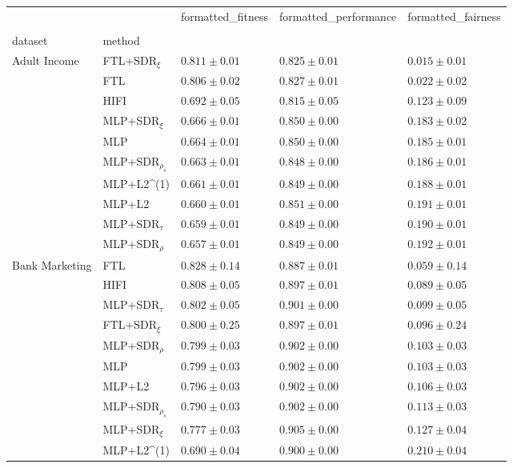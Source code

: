 \begin{tabular}{lllll}
\toprule
 &  & formatted_fitness & formatted_performance & formatted_fairness \\
 &  &  &  &  \\
dataset & method &  &  &  \\
\midrule
\multirow[t]{10}{*}{Adult Income} & FTL+SDR$_{\xi}$ & $0.811 \pm0.01$ & $0.825 \pm0.01$ & $0.015 \pm0.01$ \\
 & FTL & $0.806 \pm0.02$ & $0.827 \pm0.01$ & $0.022 \pm0.02$ \\
 & HIFI & $0.692 \pm0.05$ & $0.815 \pm0.05$ & $0.123 \pm0.09$ \\
 & MLP+SDR$_{\xi}$ & $0.666 \pm0.01$ & $0.850 \pm0.00$ & $0.183 \pm0.02$ \\
 & MLP & $0.664 \pm0.01$ & $0.850 \pm0.00$ & $0.185 \pm0.01$ \\
 & MLP+SDR$_{\rho_s}$ & $0.663 \pm0.01$ & $0.848 \pm0.00$ & $0.186 \pm0.01$ \\
 & MLP+L2^{(1)} & $0.661 \pm0.01$ & $0.849 \pm0.00$ & $0.188 \pm0.01$ \\
 & MLP+L2 & $0.660 \pm0.01$ & $0.851 \pm0.00$ & $0.191 \pm0.01$ \\
 & MLP+SDR$_{\tau}$ & $0.659 \pm0.01$ & $0.849 \pm0.00$ & $0.190 \pm0.01$ \\
 & MLP+SDR$_{\rho}$ & $0.657 \pm0.01$ & $0.849 \pm0.00$ & $0.192 \pm0.01$ \\
\cline{1-5}
\multirow[t]{10}{*}{Bank Marketing} & FTL & $0.828 \pm0.14$ & $0.887 \pm0.01$ & $0.059 \pm0.14$ \\
 & HIFI & $0.808 \pm0.05$ & $0.897 \pm0.01$ & $0.089 \pm0.05$ \\
 & MLP+SDR$_{\tau}$ & $0.802 \pm0.05$ & $0.901 \pm0.00$ & $0.099 \pm0.05$ \\
 & FTL+SDR$_{\xi}$ & $0.800 \pm0.25$ & $0.897 \pm0.01$ & $0.096 \pm0.24$ \\
 & MLP+SDR$_{\rho}$ & $0.799 \pm0.03$ & $0.902 \pm0.00$ & $0.103 \pm0.03$ \\
 & MLP & $0.799 \pm0.03$ & $0.902 \pm0.00$ & $0.103 \pm0.03$ \\
 & MLP+L2 & $0.796 \pm0.03$ & $0.902 \pm0.00$ & $0.106 \pm0.03$ \\
 & MLP+SDR$_{\rho_s}$ & $0.790 \pm0.03$ & $0.902 \pm0.00$ & $0.113 \pm0.03$ \\
 & MLP+SDR$_{\xi}$ & $0.777 \pm0.03$ & $0.905 \pm0.00$ & $0.127 \pm0.04$ \\
 & MLP+L2^{(1)} & $0.690 \pm0.04$ & $0.900 \pm0.00$ & $0.210 \pm0.04$ \\

\end{tabular}
